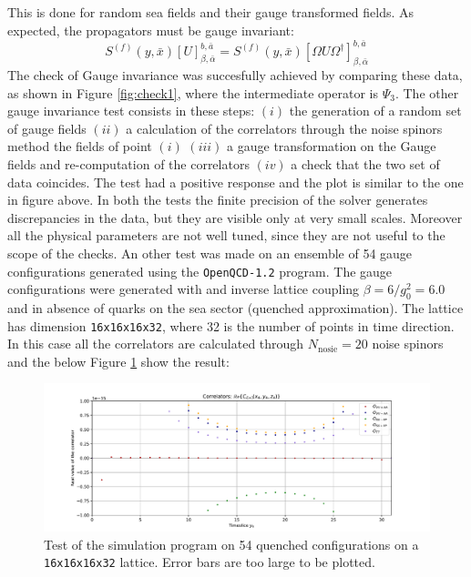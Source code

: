 \documentclass[english, LaM, oneside, noexaminfo]{sapthesis}
\begin{document}
This is done for random sea fields and their gauge transformed fields.
As expected, the propagators must be gauge invariant:
\begin{equation*}
    S^{(f)}(y, \bar x)[U]^{b,\bar a}_{\beta, \bar \alpha} = S^{(f)}(y, \bar x)[\Omega U \Omega^\dagger]^{b,\bar a}_{\beta, \bar \alpha} 
\end{equation*}
The check of Gauge invariance was succesfully achieved by comparing these data, as shown in Figure \ref{fig:check1}, where the intermediate operator is $\Psi_3$.
\newline
The other gauge invariance test consists in these steps:
$(i)$ the generation of a random set of gauge fields
$(ii)$ a calculation of the correlators through the noise spinors method the fields of point $(i)$
$(iii)$ a gauge transformation on the Gauge fields and re-computation of the correlators
$(iv)$ a check that the two set of data coincides.
The test had a positive response and the plot is similar to the one in figure above.
In both the tests the finite precision of the solver generates discrepancies in the data, but they are visible only at very small scales.
Moreover all the physical parameters are not well tuned, since they are not useful to the scope of the checks. 
\newline
An other test was made on an ensemble of 54 gauge configurations generated using the \texttt{OpenQCD-1.2} program.
The gauge configurations were generated with and inverse lattice coupling $\beta = 6/g_0^2 = 6.0$ and in absence of quarks on the sea sector (quenched approximation).
The lattice has dimension \texttt{16x16x16x32}, where 32 is the number of points in time direction.
In this case all the correlators are calculated through $N_\text{nosie} = 20$ noise spinors and the below Figure \ref{fig:pureYM} show the result:
\begin{figure}[!h]
    \centering
    \includegraphics[width=\textwidth]{imgs-MSc-thesis/pureYM.pdf}
    \caption{Test of the simulation program on 54 quenched configurations on a \texttt{16x16x16x32} lattice.
        Error bars are too large to be plotted.}
    \label{fig:pureYM}
\end{figure}
\end{document}
